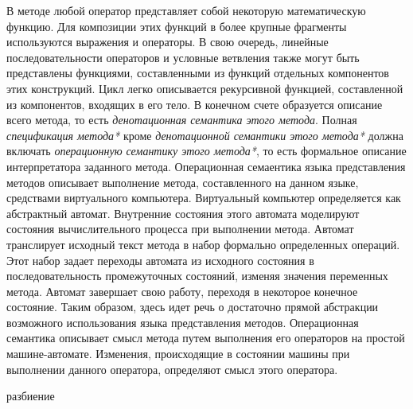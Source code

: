 \begin{itemize}
\begin{SCn}
\begin{scnindent}
\end{scnindent}
\end{SCn}

В методе любой оператор представляет собой некоторую математическую функцию. Для композиции этих функций в более
крупные фрагменты используются выражения и операторы. В свою очередь, линейные последовательности операторов
и условные ветвления также могут быть представлены функциями, составленными из функций отдельных компонентов этих
конструкций. Цикл легко описывается рекурсивной функцией, составленной из компонентов, входящих в его тело. В конечном
счете образуется описание всего метода, то есть \textit{денотационная семантика этого метода}. Полная
\textit{спецификация метода*} кроме \textit{денотационной семантики этого метода*} должна включать \textit{операционную
семантику этого метода*}, то есть формальное описание интерпретатора заданного метода. Операционная семаентика языка
представления методов описывает выполнение метода, составленного на данном языке, средствами виртуального компьютера.
Виртуальный компьютер определяется как абстрактный автомат. Внутренние состояния этого автомата моделируют состояния
вычислительного процесса при выполнении метода. Автомат транслирует исходный текст метода в набор формально определенных
операций. Этот набор задает переходы автомата из исходного состояния в последовательность промежуточных состояний,
изменяя значения переменных метода. Автомат завершает свою работу, переходя в некоторое конечное состояние.
Таким образом, здесь идет речь о достаточно прямой абстракции возможного использования языка представления методов.
Операционная семантика описывает смысл метода путем выполнения его операторов на простой машине-автомате.
Изменения, происходящие в состоянии машины при выполнении данного оператора, определяют смысл этого оператора.

\begin{SCn}
\begin{scnrelfromset}{разбиение}
    \begin{scnindent}
    \end{scnindent}
    \begin{scnindent}
    \end{scnindent}
\end{scnrelfromset}
\end{SCn}


\end{itemize}
